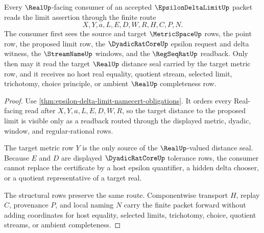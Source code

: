 \begin{theorem}
\label{thm:epsilon-delta-limit-real-seal-nonescape}
Every $\RealUp$-facing consumer of an accepted $\EpsilonDeltaLimitUp$ packet reads the limit assertion through the finite route
$$
X,Y,a,L,E,D,W,R,H,C,P,N.
$$
The consumer first sees the source and target $\MetricSpaceUp$ rows, the point row, the proposed limit row, the $\DyadicRatCoreUp$ epsilon request and delta witness, the $\StreamNameUp$ windows, and the $\RegSeqRatUp$ readback. Only then may it read the target $\RealUp$ distance seal carried by the target metric row, and it receives no host real equality, quotient stream, selected limit, trichotomy, choice principle, or ambient $\RealUp$ completeness row.
\end{theorem}
\begin{proof}
Use \autoref{thm:epsilon-delta-limit-namecert-obligations}. It orders every Real-facing read after $X,Y,a,L,E,D,W,R$, so the target distance to the proposed limit is visible only as a readback routed through the displayed metric, dyadic, window, and regular-rational rows.

The target metric row $Y$ is the only source of the $\RealUp$-valued distance seal. Because $E$ and $D$ are displayed $\DyadicRatCoreUp$ tolerance rows, the consumer cannot replace the certificate by a host epsilon quantifier, a hidden delta chooser, or a quotient representative of a target real.

The structural rows preserve the same route. Componentwise transport $H$, replay $C$, provenance $P$, and local naming $N$ carry the finite packet forward without adding coordinates for host equality, selected limits, trichotomy, choice, quotient streams, or ambient completeness.
\end{proof}



